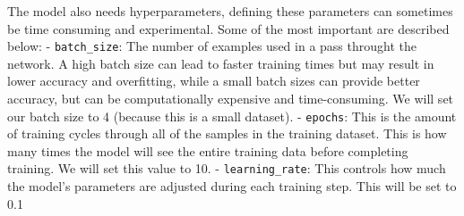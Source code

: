 \documentclass[
  letterpaper,
  DIV=11,
  numbers=noendperiod]{scrreprt}
\begin{document}
The model also needs hyperparameters, defining these parameters can
sometimes be time consuming and experimental. Some of the most important
are described below: - \texttt{batch\_size}: The number of examples used
in a pass throught the network. A high batch size can lead to faster
training times but may result in lower accuracy and overfitting, while a
small batch sizes can provide better accuracy, but can be
computationally expensive and time-consuming. We will set our batch size
to 4 (because this is a small dataset). - \texttt{epochs}: This is the
amount of training cycles through all of the samples in the training
dataset. This is how many times the model will see the entire training
data before completing training. We will set this value to 10. -
\texttt{learning\_rate}: This controls how much the model's parameters
are adjusted during each training step. This will be set to 0.1
\end{document}
